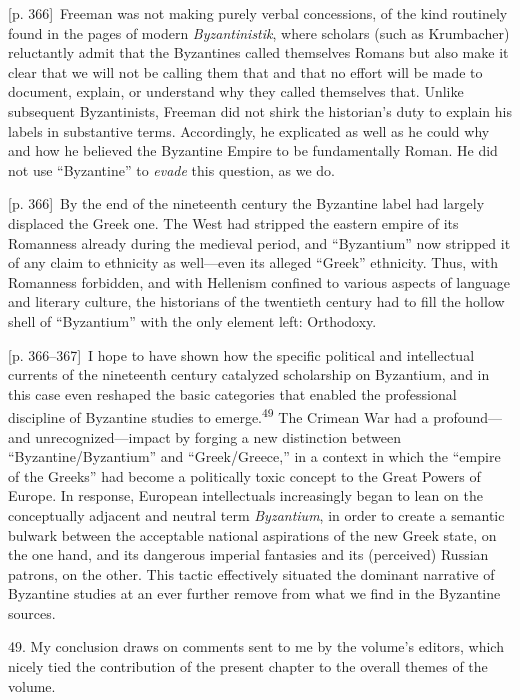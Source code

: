 \documentclass[10pt,a4paper]{article}
\begin{document}
{\scriptsize\color{gray}[p. 366]}\ Freeman was not making purely verbal concessions, of the kind routinely found in the pages of modern \textit{Byzantinistik}, where scholars (such as Krumbacher) reluctantly admit that the Byzantines called themselves Romans but also make it clear that we will not be calling them that and that no effort will be made to document, explain, or understand why they called themselves that. Unlike subsequent Byzantinists, Freeman did not shirk the historian’s duty to explain his labels in substantive terms. Accordingly, he explicated as well as he could why and how he believed the Byzantine Empire to be fundamentally Roman. He did not use “Byzantine” to \textit{evade} this question, as we do.\par
{\scriptsize\color{gray}[p. 366]}\ By the end of the nineteenth century the Byzantine label had largely displaced the Greek one. The West had stripped the eastern empire of its Romanness already during the medieval period, and “Byzantium” now stripped it of any claim to ethnicity as well—even its alleged “Greek” ethnicity. Thus, with Romanness forbidden, and with Hellenism confined to various aspects of language and literary culture, the historians of the twentieth century had to fill the hollow shell of “Byzantium” with the only element left: Orthodoxy.\par
{\scriptsize\color{gray}[p. 366–367]}\ I hope to have shown how the specific political and intellectual currents of the nineteenth century catalyzed scholarship on Byzantium, and in this case even reshaped the basic categories that enabled the professional discipline of Byzantine studies to emerge.\nobreak\textsuperscript{49} The Crimean War had a profound—and unrecognized—impact by forging a new distinction between “Byzantine/Byzantium” and “Greek/Greece,” in a context in which the “empire of the Greeks” had become a politically toxic concept to the Great Powers of Europe. In response, European intellectuals increasingly began to lean on the conceptually adjacent and neutral term \textit{Byzantium}, in order to create a semantic bulwark between the acceptable national aspirations of the new Greek state, on the one hand, and its dangerous imperial fantasies and its (perceived) Russian patrons, on the other. This tactic effectively situated the dominant narrative of Byzantine studies at an ever further remove from what we find in the Byzantine sources.\par{\small 49. My conclusion draws on comments sent to me by the volume’s editors, which nicely tied the contribution of the present chapter to the overall themes of the volume.\par}
\end{document}
